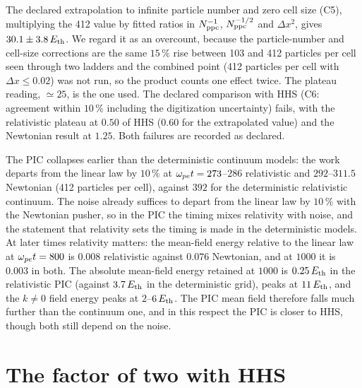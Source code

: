 The declared extrapolation to infinite particle number and zero cell size (C5), multiplying the 412 value by fitted ratios in $N_{\rm ppc}^{-1}$, $N_{\rm ppc}^{-1/2}$ and $\Delta x^2$, gives $30.1\pm3.8\,E_{\rm th}$. We regard it as an overcount, because the particle-number and cell-size corrections are the same $15\,\%$ rise between 103 and 412 particles per cell seen through two ladders and the combined point (412 particles per cell with $\Delta x\le0.02$) was not run, so the product counts one effect twice. The plateau reading, $\simeq25$, is the one used. The declared comparison with HHS (C6: agreement within $10\,\%$ including the digitization uncertainty) fails, with the relativistic plateau at $0.50$ of HHS ($0.60$ for the extrapolated value) and the Newtonian result at $1.25$. Both failures are recorded as declared.


The PIC collapses earlier than the deterministic continuum models: the work departs from the linear law by $10\,\%$ at $\omega_{pe} t=273$--$286$ relativistic and $292$--$311.5$ Newtonian (412 particles per cell), against $392$ for the deterministic relativistic continuum. The noise already suffices to depart from the linear law by $10\,\%$ with the Newtonian pusher, so in the PIC the timing mixes relativity with noise, and the statement that relativity sets the timing is made in the deterministic models. At later times relativity matters: the mean-field energy relative to the linear law at $\omega_{pe} t=800$ is $0.008$ relativistic against $0.076$ Newtonian, and at $1000$ it is $0.003$ in both. The absolute mean-field energy retained at $1000$ is $0.25\,E_{\rm th}$ in the relativistic PIC (against $3.7\,E_{\rm th}$ in the deterministic grid), peaks at $11\,E_{\rm th}$, and the $k\ne0$ field energy peaks at $2$--$6\,E_{\rm th}$. The PIC mean field therefore falls much further than the continuum one, and in this respect the PIC is closer to HHS, though both still depend on the noise.

\section{The factor of two with HHS}\label{sec:c10-factor2}

